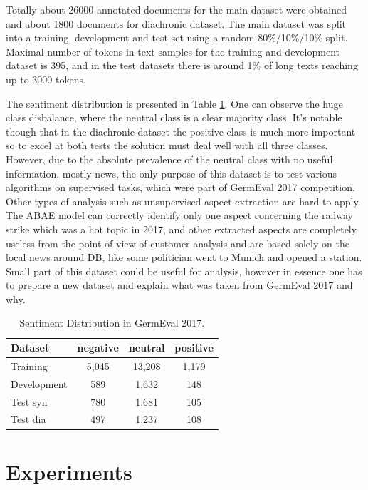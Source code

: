 \documentclass{article}
\begin{document}
Totally about 26000 annotated documents for the main dataset were obtained and about 1800 documents for diachronic dataset. The main dataset was split into a training, development and test
set using a random 80\%/10\%/10\% split. Maximal number of tokens in text samples for the training and development dataset is 395, and in the test datasets there is around 1\% of long texts reaching up to 3000 tokens.

The sentiment distribution is presented in Table \ref{tab:sent}. One can observe the huge class disbalance, where the neutral class is a clear majority class. It's notable though that in the diachronic dataset the positive class is much more important so to excel at both tests the solution must deal well with all three classes.  However, due to the absolute prevalence of the neutral class with no useful information, mostly news, the only purpose of this dataset is to test various algorithms on supervised tasks, which were part of GermEval 2017 competition. Other types of analysis such as unsupervised aspect extraction are hard to apply. The ABAE model can correctly identify only one aspect concerning the railway strike which was a hot topic in 2017, and other extracted aspects are completely useless from the point of view of customer analysis and are based solely on the local news around DB, like some politician went to Munich and opened a station. Small part of this dataset could be useful for analysis, however in essence one has to prepare a new dataset and explain what was taken from GermEval 2017 and why.


\begin{table}[tbh!]
\begin{center}
\begin{tabular}[t]{|l|ccc|}
\hline
Dataset & negative & neutral & positive \\
\hline
Training & 5,045 & 13,208 & 1,179  \\
Development & 589 & 1,632 & 148 \\
Test syn & 780 & 1,681 & 105 \\
Test dia & 497 & 1,237 & 108 \\
\hline
\end{tabular}
\caption{Sentiment Distribution in GermEval 2017.}
\label{tab:sent}
\end{center}
\end{table}


\section{Experiments}
\end{document}
